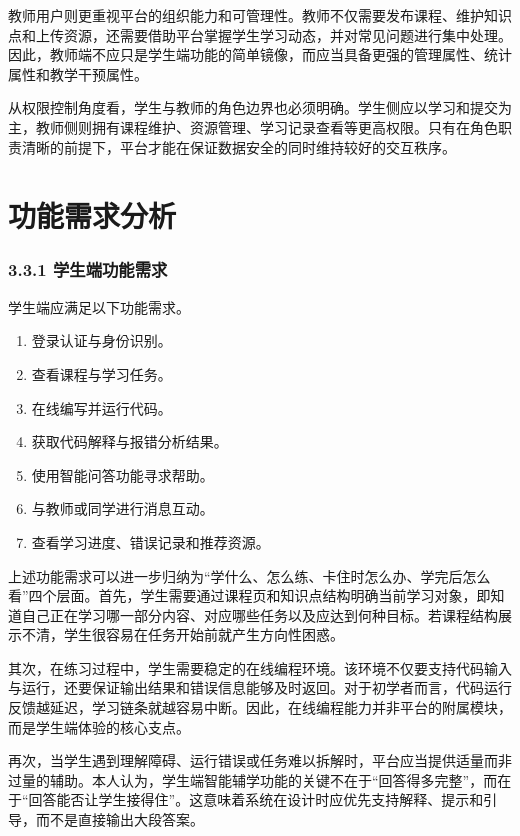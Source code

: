 教师用户则更重视平台的组织能力和可管理性。教师不仅需要发布课程、维护知识点和上传资源，还需要借助平台掌握学生学习动态，并对常见问题进行集中处理。因此，教师端不应只是学生端功能的简单镜像，而应当具备更强的管理属性、统计属性和教学干预属性。

从权限控制角度看，学生与教师的角色边界也必须明确。学生侧应以学习和提交为主，教师侧则拥有课程维护、资源管理、学习记录查看等更高权限。只有在角色职责清晰的前提下，平台才能在保证数据安全的同时维持较好的交互秩序。

\section{功能需求分析}\label{ux529fux80fdux9700ux6c42ux5206ux6790}

\subsubsection{3.3.1 学生端功能需求}\label{ux5b66ux751fux7aefux529fux80fdux9700ux6c42}

学生端应满足以下功能需求。

\begin{enumerate}
\def\labelenumi{(\arabic{enumii})}
\tightlist
\item
  登录认证与身份识别。
\item
  查看课程与学习任务。
\item
  在线编写并运行代码。
\item
  获取代码解释与报错分析结果。
\item
  使用智能问答功能寻求帮助。
\item
  与教师或同学进行消息互动。
\item
  查看学习进度、错误记录和推荐资源。
\end{enumerate}

上述功能需求可以进一步归纳为``学什么、怎么练、卡住时怎么办、学完后怎么看''四个层面。首先，学生需要通过课程页和知识点结构明确当前学习对象，即知道自己正在学习哪一部分内容、对应哪些任务以及应达到何种目标。若课程结构展示不清，学生很容易在任务开始前就产生方向性困惑。

其次，在练习过程中，学生需要稳定的在线编程环境。该环境不仅要支持代码输入与运行，还要保证输出结果和错误信息能够及时返回。对于初学者而言，代码运行反馈越延迟，学习链条就越容易中断。因此，在线编程能力并非平台的附属模块，而是学生端体验的核心支点。

再次，当学生遇到理解障碍、运行错误或任务难以拆解时，平台应当提供适量而非过量的辅助。本人认为，学生端智能辅学功能的关键不在于``回答得多完整''，而在于``回答能否让学生接得住''。这意味着系统在设计时应优先支持解释、提示和引导，而不是直接输出大段答案。


